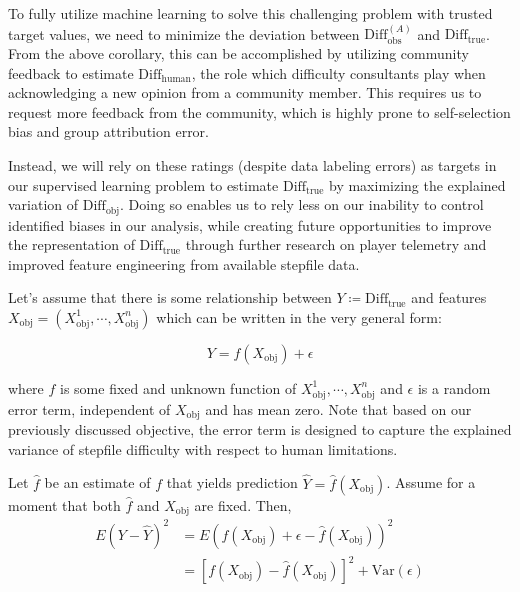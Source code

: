 To fully utilize machine learning to solve this challenging problem with trusted target values, we need to minimize the deviation between $\text{Diff}_{\text{obs}}^{(A)}$ and $\text{Diff}_{\text{true}}$. From the above corollary, this can be accomplished by utilizing community feedback to estimate $\text{Diff}_{\text{human}}$, the role which difficulty consultants play when acknowledging a new opinion from a community member. This requires us to request more feedback from the community, which is highly prone to self-selection bias and group attribution error.

\vspace{2mm}

Instead, we will rely on these ratings (despite data labeling errors) as targets in our supervised learning problem to estimate $\text{Diff}_{\text{true}}$ by maximizing the explained variation of $\text{Diff}_{\text{obj}}$. Doing so enables us to rely less on our inability to control identified biases in our analysis, while creating future opportunities to improve the representation of $\text{Diff}_{\text{true}}$ through further research on player telemetry and improved feature engineering from available stepfile data.
\vspace{2mm}

Let's assume that there is some relationship between $Y \coloneq  \text{Diff}_{\text{true}}$ and features $X_{\text{obj}} = (X_{\text{obj}}^1, \cdots, X_{\text{obj}}^n)$ which can be written in the very general form:

$$Y = f(X_{\text{obj}}) + \epsilon$$

where $f$ is some fixed and unknown function of $X_{\text{obj}}^1, \cdots, X_{\text{obj}}^n$ and $\epsilon$ is a random error term, independent of $X_{\text{obj}}$ and has mean zero. Note that based on our previously discussed objective, the error term is designed to capture the explained variance of stepfile difficulty with respect to human limitations.

\vspace{2mm}

Let $\hat{f}$ be an estimate of $f$ that yields prediction $\hat{Y} = \hat{f}(X_{\text{obj}})$. Assume for a moment that both $\hat{f}$ and $X_{\text{obj}}$ are fixed. Then,
\begin{align*}
    E(Y - \hat{Y})^2 & = E(f(X_{\text{obj}}) + \epsilon - \hat{f}(X_{\text{obj}}))^2 \\
    & = [f(X_{\text{obj}}) - \hat{f}(X_{\text{obj}})]^2 + \text{Var}(\epsilon)
\end{align*}

